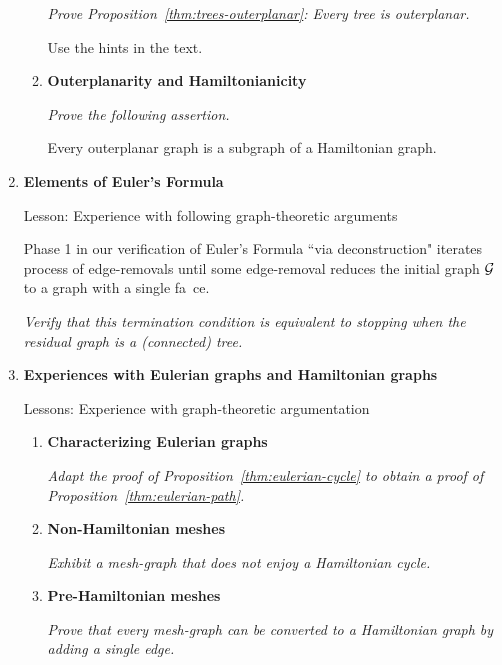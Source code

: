 \begin{enumerate}
\begin{enumerate}
{\em Prove Proposition~\ref{thm:trees-outerplanar}: Every tree is outerplanar.}

\smallskip

Use the hints in the text.

  \medskip\item
{\bf Outerplanarity and Hamiltonianicity}

\smallskip

{\em Prove the following assertion.}

\begin{prop}
Every outerplanar graph is a subgraph of a Hamiltonian graph.
\end{prop}
  \end{enumerate}

\medskip\item
{\bf Elements of Euler's Formula}

{\sc Lesson:} Experience with following graph-theoretic arguments

\smallskip

Phase 1 in our verification of Euler's Formula ``via deconstruction" iterates process of edge-removals until some edge-removal reduces the initial graph $\mbox{$\cal G$}$ to a graph with a single fa\
ce.

\smallskip

{\em Verify that this termination condition is equivalent to stopping when the residual graph is a (connected) tree.}

\medskip\item
{\bf Experiences with Eulerian graphs and Hamiltonian graphs}

{\sc Lessons:} Experience with graph-theoretic argumentation

  \begin{enumerate}
  \item
{\bf Characterizing Eulerian graphs}

\smallskip

{\em Adapt the proof of Proposition~\ref{thm:eulerian-cycle} to obtain a proof of Proposition~\ref{thm:eulerian-path}.}

  \medskip\item
{\bf Non-Hamiltonian meshes}

\smallskip

{\em Exhibit a mesh-graph that does not enjoy a Hamiltonian cycle.}

  \medskip\item
{\bf Pre-Hamiltonian meshes}

\smallskip

{\em Prove that every mesh-graph can be converted to a Hamiltonian graph by adding a single edge.}
  \end{enumerate}
\end{enumerate}

